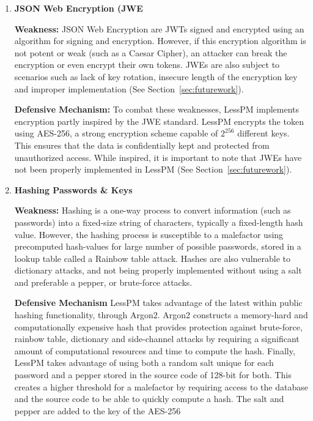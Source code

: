 \begin{enumerate}[label=$\blacktriangleright$]
  \item \textbf{JSON Web Encryption (JWE}

  \textbf{Weakness:}
  JSON Web Encryption are JWTs signed and encrypted using an algorithm for
  signing and encryption.
  However, if this encryption algorithm is not potent or weak (such as a
  Caesar Cipher), an attacker can break the encryption or even encrypt their own
  tokens.
  JWEs are also subject to scenarios such as lack of key rotation, insecure
  length of the encryption key and improper implementation (See
  Section~\ref{sec:futurework}).

  \textbf{Defensive Mechanism:}
  To combat these weaknesses, LessPM implements encryption partly inspired by
  the JWE standard.
  LessPM encrypts the token using AES-256, a strong encryption scheme capable
  of $2^{256}$ different keys.
  This ensures that the data is confidentially kept and protected from
  unauthorized access.
  While inspired, it is important to note that JWEs have not been properly
  implemented in LessPM (See Section~\ref{sec:futurework}).

  \item \textbf{Hashing Passwords \& Keys}

  \textbf{Weakness:}
  Hashing is a one-way process to convert information (such as passwords)
  into a fixed-size string of characters, typically a fixed-length hash value.
  However, the hashing process is susceptible to a malefactor using
  precomputed hash-values for large number of possible passwords, stored in a
  lookup table called a Rainbow table attack.
  Hashes are also vulnerable to dictionary attacks, and not being properly
  implemented without using a salt and preferable a pepper, or brute-force
  attacks.

  \textbf{Defensive Mechanism}
  LessPM takes advantage of the latest within public hashing functionality,
  through Argon2.
  Argon2 constructs a memory-hard and computationally expensive hash that
  provides protection against brute-force, rainbow table, dictionary and
  side-channel attacks by requiring a significant amount of computational
  resources and time to compute the hash.
  Finally, LessPM takes advantage of using both a random salt unique for each
  password and a pepper stored in the source code of 128-bit for both.
  This creates a higher threshold for a malefactor by requiring access to the
  database and the source code to be able to quickly compute a hash.
  The salt and pepper are added to the key of the AES-256


\end{enumerate}
